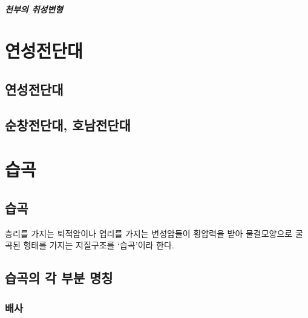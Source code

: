 \documentclass[12pt, a4paper, oneside]{book}
\begin{document}
		\paragraph{천부의 취성변형}





	\clearpage
	\chapter{연성전단대}

	\clearpage
	\section{연성전단대}


	\clearpage
	\section{순창전단대, 호남전단대}









	\clearpage
	\chapter{습곡}


	\clearpage
	\section{습곡}
	
		층리를 가지는 퇴적암이나 엽리를 가지는 변성암들이 횡압력을 받아 물결모양으로 굴곡된 형태를 가지는 지질구조를 `습곡'이라 한다.
	


	\clearpage
	\section{습곡의 각 부분 명칭}


	\subsection{배사}
\end{document}
